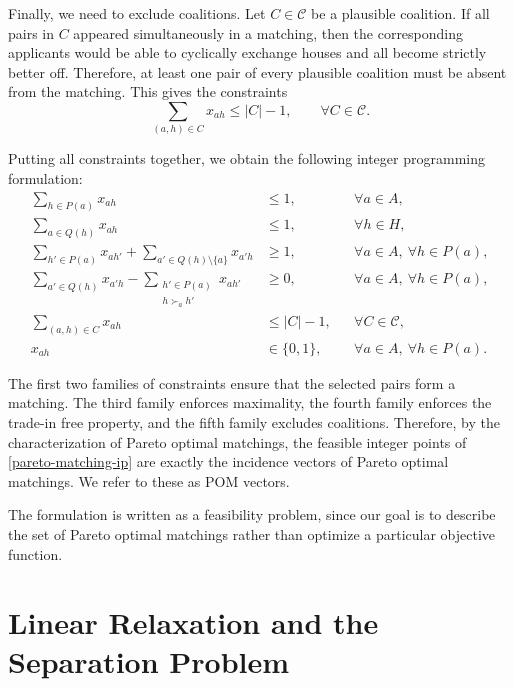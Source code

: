 \documentclass[12pt]{report}
\numberwithin{algorithm}{chapter}
\begin{document}
	Finally, we need to exclude coalitions. Let $C\in\mathcal C$ be a plausible
	coalition. If all pairs in $C$ appeared simultaneously in a matching, then the
	corresponding applicants would be able to cyclically exchange houses and all become
	strictly better off. Therefore, at least one pair of every plausible coalition must be
	absent from the matching. This gives the constraints
	\[
	\sum_{(a,h)\in C} x_{ah} \leq |C|-1,
	\qquad \forall C\in\mathcal C.
	\]
	
	Putting all constraints together, we obtain the following integer programming
	formulation:
	\begin{equation}
		\label{pareto-matching-ip}
		\begin{aligned}
			\sum_{h\in P(a)} x_{ah} &\leq 1,
			&& \forall a\in A,\\
			\sum_{a\in Q(h)} x_{ah} &\leq 1,
			&& \forall h\in H,\\
			\sum_{h'\in P(a)} x_{ah'}
			+
			\sum_{a'\in Q(h)\setminus\{a\}} x_{a'h}
			&\geq 1,
			&& \forall a\in A,\ \forall h\in P(a),\\
			\sum_{a'\in Q(h)} x_{a'h}
			-
			\sum_{\substack{h'\in P(a)\\ h \succ_{a} h'}} x_{ah'}
			&\geq 0,
			&& \forall a\in A,\ \forall h\in P(a),\\
			\sum_{(a,h)\in C} x_{ah} &\leq |C|-1,
			&& \forall C\in\mathcal C,\\
			x_{ah} &\in \{0,1\},
			&& \forall a\in A,\ \forall h\in P(a).
		\end{aligned}
	\end{equation}
	
	The first two families of constraints ensure that the selected pairs form a
	matching. The third family enforces maximality, the fourth family enforces the
	trade-in free property, and the fifth family excludes coalitions. Therefore, by the
	characterization of Pareto optimal matchings, the feasible integer points of
	\eqref{pareto-matching-ip} are exactly the incidence vectors of Pareto optimal
	matchings. We refer to these as POM vectors.
	
	The formulation is written as a feasibility problem, since our goal is to describe
	the set of Pareto optimal matchings rather than optimize a particular objective
	function. 


\section{Linear Relaxation and the Separation Problem} \label{linear-relaxation}
\end{document}
